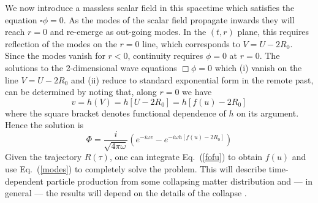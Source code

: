 \documentclass[12pt]{iopart}
\begin{document}
  We  now introduce a massless scalar field in this spacetime  which satisfies the equation $\square \phi =0$.
  As the modes of the scalar field propagate inwards they will reach $r=0$ and re-emerge as out-going modes.
  In the $(t,r)$ plane, this requires reflection of the modes on the $r=0$ line, which 
  corresponds to $V=U-2R_0$. 
  Since the modes vanish for $r<0$, continuity requires $\phi=0$ at $r=0$.
  The solutions to the 2-dimensional wave equations $\Box \phi =0$
  which (i) vanish on the line $V=U-2R_0$ and (ii) reduce to standard exponential form in the 
  remote past, can be determined by noting that, along $r=0$ we have
  \begin{equation}
  v=h(V)=h[U-2R_0] = h[f(u)-2R_0]
  \end{equation}
  where the square bracket denotes functional dependence of $h$ on its argument.
  Hence the solution is 
  \begin{equation}
  \Phi = \frac{i}{\sqrt{4\pi \omega}} \left( e^{-i\omega v} - e^{-i\omega h[f(u)-2R_0]}\right)
  \label{modes}
  \end{equation}
  Given the trajectory $R(\tau)$, one can integrate  Eq.~(\ref{fofu}) to obtain $f(u)$ and use
  Eq.~(\ref{modes}) to completely solve the problem. This will describe time-dependent particle production
  from some collapsing matter distribution and --- in general --- the results will depend on the details of the collapse \cite{Brout:1995rd,aseemtpbh09}.
  
\end{document}

